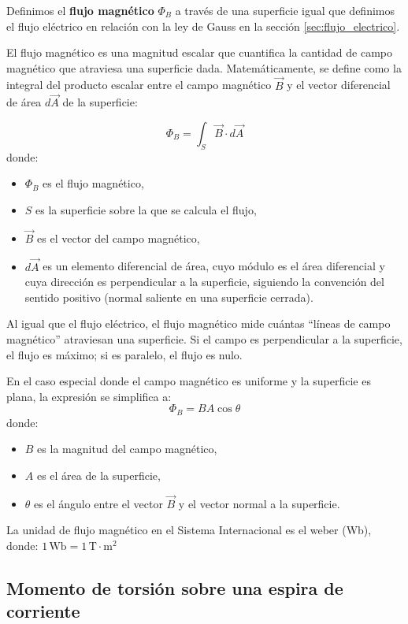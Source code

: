 Definimos el \textbf{flujo magnético} \(\Phi_B\) a través de una superficie igual que definimos el flujo eléctrico en relación con la ley de Gauss en la sección \ref{sec:flujo_electrico}. 

El flujo magnético es una magnitud escalar que cuantifica la cantidad de campo magnético que atraviesa una superficie dada. Matemáticamente, se define como la integral del producto escalar entre el campo magnético \(\vec{B}\) y el vector diferencial de área \(d\vec{A}\) de la superficie:

\[
\Phi_B = \int_S \vec{B} \cdot d\vec{A}
\]
donde:
\begin{itemize}
  \item \(\Phi_B\) es el flujo magnético,
  \item \(S\) es la superficie sobre la que se calcula el flujo,
  \item \(\vec{B}\) es el vector del campo magnético,
  \item \(d\vec{A}\) es un elemento diferencial de área, cuyo módulo es el área diferencial y cuya dirección es perpendicular a la superficie, siguiendo la convención del sentido positivo (normal saliente en una superficie cerrada).
\end{itemize}

Al igual que el flujo eléctrico, el flujo magnético mide cuántas ``líneas de campo magnético'' atraviesan una superficie. Si el campo es perpendicular a la superficie, el flujo es máximo; si es paralelo, el flujo es nulo.

En el caso especial donde el campo magnético es uniforme y la superficie es plana, la expresión se simplifica a:
\[
\Phi_B = B A \cos\theta
\]
donde:
\begin{itemize}
  \item \(B\) es la magnitud del campo magnético,
  \item \(A\) es el área de la superficie,
  \item \(\theta\) es el ángulo entre el vector \(\vec{B}\) y el vector normal a la superficie.
\end{itemize}

La unidad de flujo magnético en el Sistema Internacional es el weber (Wb), donde: \(1 \, \text{Wb} = 1 \, \text{T} \cdot \text{m}^2\)

\subsection{Momento de torsión sobre una espira de corriente}

